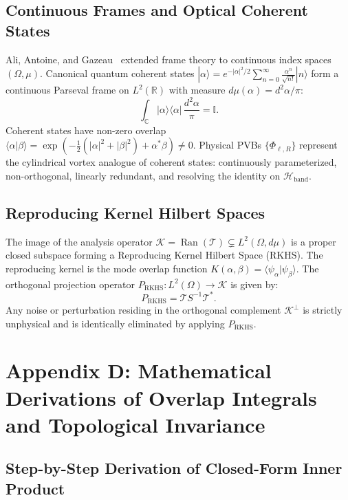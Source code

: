 \documentclass[11pt,a4paper]{article}
\begin{document}
\subsection{Continuous Frames and Optical Coherent States}

Ali, Antoine, and Gazeau~\cite{Ali1993,Gazeau2009} extended frame theory to continuous index spaces $(\Omega, \mu)$. Canonical quantum coherent states $|\alpha\rangle = e^{-|\alpha|^2/2} \sum_{n=0}^\infty \frac{\alpha^n}{\sqrt{n!}} |n\rangle$ form a continuous Parseval frame on $L^2(\mathbb{R})$ with measure $d\mu(\alpha) = d^2\alpha / \pi$:
\begin{equation}
\int_{\mathbb{C}} |\alpha\rangle \langle \alpha| \, \frac{d^2\alpha}{\pi} = \mathbb{I}.
\end{equation}
Coherent states have non-zero overlap $\langle \alpha | \beta \rangle = \exp(-\frac{1}{2}(|\alpha|^2 + |\beta|^2) + \alpha^* \beta) \neq 0$. Physical PVBs $\{\Phi_{\ell, R}\}$ represent the cylindrical vortex analogue of coherent states: continuously parameterized, non-orthogonal, linearly redundant, and resolving the identity on $\mathcal{H}_{\text{band}}$.

\subsection{Reproducing Kernel Hilbert Spaces}

The image of the analysis operator $\mathcal{K} = \operatorname{Ran}(\mathcal{T}) \subsetneq L^2(\Omega, d\mu)$ is a proper closed subspace forming a Reproducing Kernel Hilbert Space (RKHS). The reproducing kernel is the mode overlap function $K(\alpha, \beta) = \langle \psi_\alpha | \psi_\beta \rangle$. The orthogonal projection operator $P_{\text{RKHS}}: L^2(\Omega) \to \mathcal{K}$ is given by:
\begin{equation}
P_{\text{RKHS}} = \mathcal{T} S^{-1} \mathcal{T}^*.
\end{equation}
Any noise or perturbation residing in the orthogonal complement $\mathcal{K}^\perp$ is strictly unphysical and is identically eliminated by applying $P_{\text{RKHS}}$.

\section{Appendix D: Mathematical Derivations of Overlap Integrals and Topological Invariance}
\label{app:derivations}

\subsection{Step-by-Step Derivation of Closed-Form Inner Product}
\end{document}
